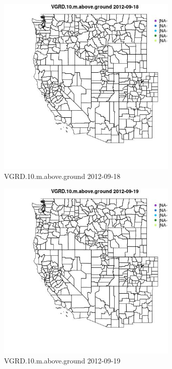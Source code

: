 \begin{figure} 
\centering  
\includegraphics[width=0.77\textwidth]{Code_Outputs/ML_input_report_ML_input_PM25_Step5_part_d_de_duplicated_aves_ML_input_MapObsVGRD10maboveground2012-09-18.jpg} 
\caption{\label{fig:ML_input_report_ML_input_PM25_Step5_part_d_de_duplicated_aves_ML_inputMapObsVGRD10maboveground2012-09-18}VGRD.10.m.above.ground 2012-09-18} 
\end{figure} 
 

\clearpage 

\begin{figure} 
\centering  
\includegraphics[width=0.77\textwidth]{Code_Outputs/ML_input_report_ML_input_PM25_Step5_part_d_de_duplicated_aves_ML_input_MapObsVGRD10maboveground2012-09-19.jpg} 
\caption{\label{fig:ML_input_report_ML_input_PM25_Step5_part_d_de_duplicated_aves_ML_inputMapObsVGRD10maboveground2012-09-19}VGRD.10.m.above.ground 2012-09-19} 
\end{figure} 
 

